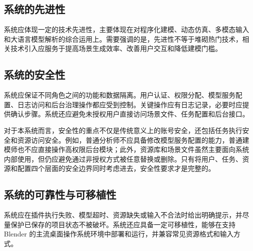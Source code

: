 \documentclass[UTF8,a4paper,10pt]{ctexart}
\begin{document}
\subsection{系统的先进性}
系统应体现一定的技术先进性，主要体现在对程序化建模、动态仿真、多模态输入和大语言模型解析的综合运用上。需要强调的是，先进性不等于堆砌热门技术，相关技术引入应服务于提高场景生成效率、改善用户交互和降低建模门槛。

\subsection{系统的安全性}
系统应保证不同角色之间的功能和数据隔离。用户认证、权限分配、模型服务配置、日志访问和后台治理操作都应受到控制。关键操作应有日志记录，必要时应提供确认步骤。系统还应避免未授权用户直接访问场景文件、任务配置和后台接口。

对于本系统而言，安全性的重点不仅是传统意义上的账号安全，还包括任务执行安全和资源访问安全。例如，普通分析师不应具备修改模型服务配置的能力，普通建模师也不应直接操作高权限后台模块；此外，资源库和场景文件虽然主要面向系统内部使用，但仍应避免通过非授权方式被任意替换或删除。只有将用户、任务、资源和配置四个层面的安全边界同时考虑进去，安全性要求才是完整的。

\subsection{系统的可靠性与可移植性}
系统应在插件执行失败、模型超时、资源缺失或输入不合法时给出明确提示，并尽量保护已保存的项目状态不被破坏。系统还应具备一定可移植性，能够在支持 Blender 的主流桌面操作系统环境中部署和运行，并兼容常见资源格式和输入方式。
\end{document}
